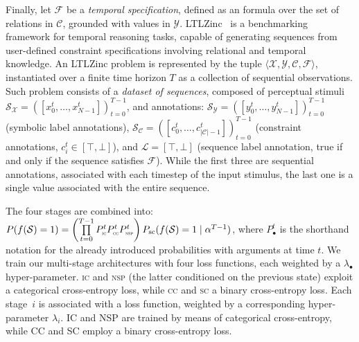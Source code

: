 Finally, let $\mathcal{F}$ be a \textit{temporal specification}, defined as an \LTLf formula over the set of relations in $\mathcal{C}$,  grounded with values in $\mathcal{Y}$.
LTLZinc~\cite{lorello2025neuro} %
is a benchmarking framework for temporal reasoning tasks, capable of generating sequences from user-defined constraint specifications involving relational and temporal knowledge. 
An LTLZinc problem is represented by the tuple $\langle \mathcal{X}, \mathcal{Y}, \mathcal{C}, \mathcal{F}\rangle$, instantiated over a finite time horizon $T$ as a collection of sequential observations. Such problem consists of a \textit{dataset of sequences}, composed of perceptual stimuli $\mathcal{S}_\mathcal{X} = ([x_0^t, \dots, x_{N-1}^t])_{t=0}^{T-1}$, and annotations: $\mathcal{S}_\mathcal{Y} = ([y_0^t, \dots, y_{N-1}^t])_{t=0}^{T-1}$ (symbolic label annotations), $\mathcal{S}_\mathcal{C} = ([c_0^t, \dots, c_{|\mathcal{C}|-1}^t])_{t=0}^{T-1}$ (constraint annotations, $c_i^t \in [\top, \bot]$), and $\mathcal{L} = [\top, \bot]$ (sequence label annotation, true if and only if the sequence satisfies $\mathcal{F}$). While the first three are sequential annotations, associated with each timestep of the input stimulus, the last one is a single value associated with the entire sequence.

The four stages are combined into: 
$P(f(\mathcal{S}) = 1) =  \left( \prod\limits_{t=0}^{T-1} P^t_{\text{\sc\tiny ic}} P^t_{\text{\sc\tiny cc}} P^t_{\text{\sc\tiny nsp}} \right) P_{\text{sc}}(f(\mathcal{S}) = 1 \mid \alpha^{T-1})$,
where $P^t_{\bullet}$ is the shorthand notation for the already introduced probabilities with arguments at time $t$.
We train our multi-stage architectures with four loss functions, each weighted by a $\lambda_{\bullet}$ hyper-parameter. \textsc{ic} and \textsc{nsp} (the latter conditioned on the previous state) exploit a %
categorical cross-entropy loss, %
while \textsc{cc} and \textsc{sc} %
a binary cross-entropy loss.
\fi
\iffalse
Each stage~$i$ is associated with a loss function, weighted by a corresponding hyper-parameter $\lambda_{i}$. 
\textsc{IC} and \textsc{NSP} are trained by means of categorical cross-entropy, while \textsc{CC} and \textsc{SC} employ a binary cross-entropy loss. %


